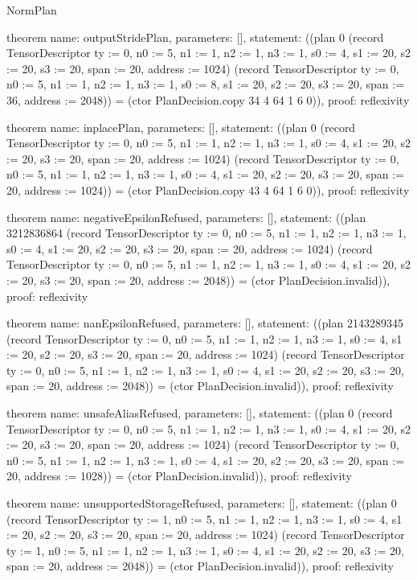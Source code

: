 \begin{lexlean}{NormPlan}
\begin{semanticmodule}
theorem{
  name: outputStridePlan,
  parameters: [],
  statement: ((plan 0 (record TensorDescriptor {ty := 0, n0 := 5, n1 := 1, n2 := 1, n3 := 1, s0 := 4, s1 := 20, s2 := 20, s3 := 20, span := 20, address := 1024}) (record TensorDescriptor {ty := 0, n0 := 5, n1 := 1, n2 := 1, n3 := 1, s0 := 8, s1 := 20, s2 := 20, s3 := 20, span := 36, address := 2048})) = (ctor PlanDecision.copy 34 4 64 1 6 0)),
  proof: reflexivity{}
}

theorem{
  name: inplacePlan,
  parameters: [],
  statement: ((plan 0 (record TensorDescriptor {ty := 0, n0 := 5, n1 := 1, n2 := 1, n3 := 1, s0 := 4, s1 := 20, s2 := 20, s3 := 20, span := 20, address := 1024}) (record TensorDescriptor {ty := 0, n0 := 5, n1 := 1, n2 := 1, n3 := 1, s0 := 4, s1 := 20, s2 := 20, s3 := 20, span := 20, address := 1024})) = (ctor PlanDecision.copy 43 4 64 1 6 0)),
  proof: reflexivity{}
}

theorem{
  name: negativeEpsilonRefused,
  parameters: [],
  statement: ((plan 3212836864 (record TensorDescriptor {ty := 0, n0 := 5, n1 := 1, n2 := 1, n3 := 1, s0 := 4, s1 := 20, s2 := 20, s3 := 20, span := 20, address := 1024}) (record TensorDescriptor {ty := 0, n0 := 5, n1 := 1, n2 := 1, n3 := 1, s0 := 4, s1 := 20, s2 := 20, s3 := 20, span := 20, address := 2048})) = (ctor PlanDecision.invalid)),
  proof: reflexivity{}
}

theorem{
  name: nanEpsilonRefused,
  parameters: [],
  statement: ((plan 2143289345 (record TensorDescriptor {ty := 0, n0 := 5, n1 := 1, n2 := 1, n3 := 1, s0 := 4, s1 := 20, s2 := 20, s3 := 20, span := 20, address := 1024}) (record TensorDescriptor {ty := 0, n0 := 5, n1 := 1, n2 := 1, n3 := 1, s0 := 4, s1 := 20, s2 := 20, s3 := 20, span := 20, address := 2048})) = (ctor PlanDecision.invalid)),
  proof: reflexivity{}
}

theorem{
  name: unsafeAliasRefused,
  parameters: [],
  statement: ((plan 0 (record TensorDescriptor {ty := 0, n0 := 5, n1 := 1, n2 := 1, n3 := 1, s0 := 4, s1 := 20, s2 := 20, s3 := 20, span := 20, address := 1024}) (record TensorDescriptor {ty := 0, n0 := 5, n1 := 1, n2 := 1, n3 := 1, s0 := 4, s1 := 20, s2 := 20, s3 := 20, span := 20, address := 1028})) = (ctor PlanDecision.invalid)),
  proof: reflexivity{}
}

theorem{
  name: unsupportedStorageRefused,
  parameters: [],
  statement: ((plan 0 (record TensorDescriptor {ty := 1, n0 := 5, n1 := 1, n2 := 1, n3 := 1, s0 := 4, s1 := 20, s2 := 20, s3 := 20, span := 20, address := 1024}) (record TensorDescriptor {ty := 1, n0 := 5, n1 := 1, n2 := 1, n3 := 1, s0 := 4, s1 := 20, s2 := 20, s3 := 20, span := 20, address := 2048})) = (ctor PlanDecision.invalid)),
  proof: reflexivity{}
}


\end{semanticmodule}
\end{lexlean}
